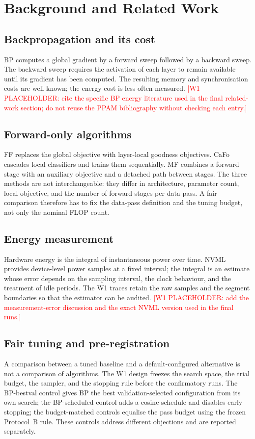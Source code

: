 \documentclass[preprint,12pt]{elsarticle}
\newcommand{\wone}[1]{\textcolor{red}{[W1 PLACEHOLDER: #1]}}
\begin{document}
\section{Background and Related Work}
\label{sec:background}

\subsection{Backpropagation and its cost}
BP computes a global gradient by a forward sweep followed by a backward sweep.
The backward sweep requires the activation of each layer to remain available
until its gradient has been computed.  The resulting memory and synchronisation
costs are well known; the energy cost is less often measured.  \wone{cite the
specific BP energy literature used in the final related-work section; do not
reuse the PPAM bibliography without checking each entry.}

\subsection{Forward-only algorithms}
FF replaces the global objective with layer-local goodness objectives.
CaFo cascades local classifiers and trains them sequentially.  MF combines a
forward stage with an auxiliary objective and a detached path between stages.
The three methods are not interchangeable: they differ in architecture,
parameter count, local objective, and the number of forward stages per data
pass.  A fair comparison therefore has to fix the data-pass definition and the
tuning budget, not only the nominal FLOP count.

\subsection{Energy measurement}
Hardware energy is the integral of instantaneous power over time.  NVML
provides device-level power samples at a fixed interval; the integral is an
estimate whose error depends on the sampling interval, the clock behaviour, and
the treatment of idle periods.  The W1 traces retain the raw samples and the
segment boundaries so that the estimator can be audited.  \wone{add the
measurement-error discussion and the exact NVML version used in the final
runs.}

\subsection{Fair tuning and pre-registration}
A comparison between a tuned baseline and a default-configured alternative is
not a comparison of algorithms.  The W1 design freezes the search space, the
trial budget, the sampler, and the stopping rule before the confirmatory runs.
The BP-bestval control gives BP the best validation-selected configuration from
its own search; the BP-scheduled control adds a cosine schedule and disables
early stopping; the budget-matched controls equalise the pass budget using the
frozen Protocol~B rule.  These controls address different objections and are
reported separately.
\end{document}
